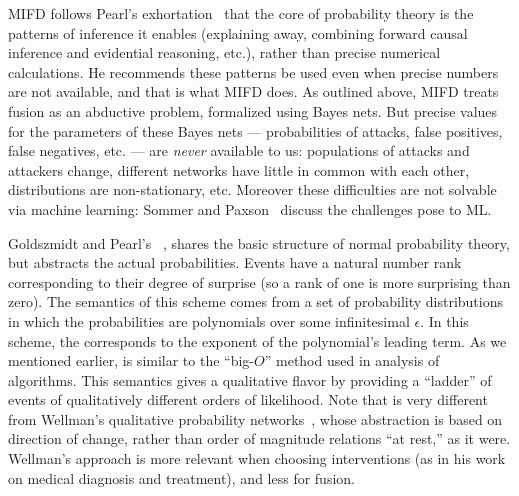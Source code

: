 
MIFD
follows Pearl's exhortation~ that the core of probability theory is
the patterns of inference it enables (explaining away, combining forward causal
inference and evidential reasoning, etc.), rather than precise numerical
calculations.  He recommends these patterns be used even when precise numbers are
not available, and that is what MIFD does.  As outlined above, MIFD treats
\ids fusion as an abductive problem, formalized using Bayes nets.
But precise values for the parameters of these Bayes nets ---
probabilities of attacks, false positives, false negatives, etc. ---
are \emph{never} available to us: populations of
attacks and attackers change, different networks have little in common with each other, distributions are
non-stationary, etc.  Moreover these difficulties are not solvable via machine learning:
Sommer and Paxson~ discuss the challenges \ids pose to ML.

Goldszmidt and
Pearl's \zplus{}~,
shares the
basic structure of normal probability theory, but abstracts the actual
probabilities.
Events have a natural number rank \tkappa{}
corresponding to their degree of surprise (so a rank of one is more surprising
than zero). The semantics of this scheme comes from a set of probability
distributions in which the probabilities are polynomials over some infinitesimal
$\epsilon$. In this scheme, the \tkappa{} corresponds to the exponent
of the polynomial's leading term.
As we mentioned earlier, \zplus is similar to the ``big-$O$'' method used
in analysis of algorithms.
This semantics gives \zplus{} a
qualitative flavor by providing a ``ladder'' of events of qualitatively different
orders of likelihood.
Note that \zplus is very different from Wellman's qualitative probability
networks~\cite{Wellman:90}, whose abstraction is based on direction of change, rather than order
of magnitude relations ``at rest,'' as it were.
Wellman's approach is more relevant when choosing interventions (as in his work
on medical diagnosis and treatment), and less for fusion.

